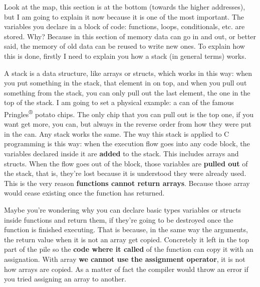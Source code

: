 \documentclass[a4paper]{article}
\begin{document}
Look at the map, this section is at the bottom (towards the higher addresses),
but I am going to explain it now because it is one of the most important. The
variables you declare in a block of code: functions, loops, conditionals, etc.
are stored. Why? Because in this section of memory data can go in and out, or
better said, the memory of old data can be reused to write new ones. To explain
how this is done, firstly I need to explain you how a stack (in general terms)
works.

A stack is a data structure, like arrays or structs, which works in this way:
when you put something in the stack, that element in on top, and when you pull
out something from the stack, you can only pull out the last element, the one
in the top of the stack. I am going to set a physical example: a can of the
famous Pringles\textsuperscript{®} potato chips. The only chip that you can
pull out is the top one, if you want get more, you can, but always in the
reverse order from how they were put in the can. Any stack works the same. The
way this stack is applied to C programming is this way: when the execution flow
goes into any code block, the variables declared inside it are \textbf{added}
to the stack. This includes arrays and structs. When the flow goes out of the
block, those variables are \textbf{pulled out} of the stack, that is, they're
lost because it is understood they were already used. This is the very reason
\textbf{functions cannot return arrays}. Because those array would cease
existing once the function has returned.

Maybe you're wondering why you can declare basic types variables or structs
inside functions and return them, if they're going to be destroyed once the
function is finished executing. That is because, in the same way the arguments,
the return value when it is not an array get copied. Concretely it left in the
top part of the pile so the \textbf{code where it called} of the function can
copy it with an assignation. With array \textbf{we cannot use the assignment
operator}, it is not how arrays are copied. As a matter of fact the compiler
would throw an error if you tried assigning an array to another.
\end{document}
